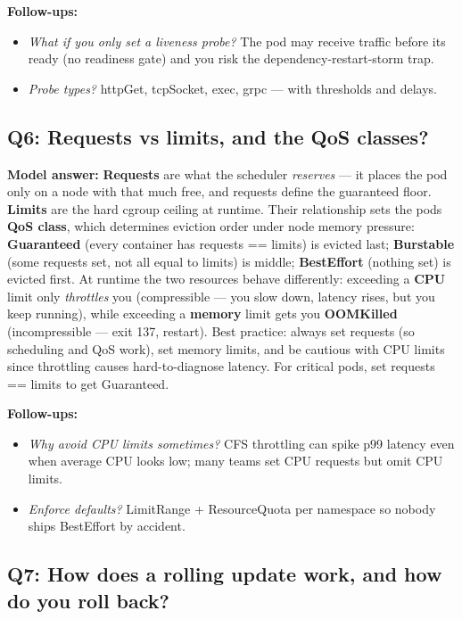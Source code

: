 \documentclass[11pt]{article}
\providecommand{\tightlist}{\setlength{\itemsep}{1pt}\setlength{\parskip}{0pt}}
\begin{document}
\textbf{Follow-ups:}

\begin{itemize}
\tightlist
\item
  \emph{What if you only set a liveness probe?} The pod may receive traffic before it\textquotesingle s ready (no readiness gate) and you risk the dependency-restart-storm trap.
\item
  \emph{Probe types?} httpGet, tcpSocket, exec, grpc --- with thresholds and delays.
\end{itemize}

\subsection{Q6: Requests vs limits, and the QoS classes?}\label{q6-requests-vs-limits-and-the-qos-classes}

\textbf{Model answer:}
\textbf{Requests} are what the scheduler \emph{reserves} --- it places the pod only on a node with that much free, and requests define the guaranteed floor. \textbf{Limits} are the hard cgroup ceiling at runtime. Their relationship sets the pod\textquotesingle s \textbf{QoS class}, which determines eviction order under node memory pressure: \textbf{Guaranteed} (every container has requests == limits) is evicted last; \textbf{Burstable} (some requests set, not all equal to limits) is middle; \textbf{BestEffort} (nothing set) is evicted first. At runtime the two resources behave differently: exceeding a \textbf{CPU} limit only \emph{throttles} you (compressible --- you slow down, latency rises, but you keep running), while exceeding a \textbf{memory} limit gets you \textbf{OOMKilled} (incompressible --- exit 137, restart). Best practice: always set requests (so scheduling and QoS work), set memory limits, and be cautious with CPU limits since throttling causes hard-to-diagnose latency. For critical pods, set requests == limits to get Guaranteed.

\textbf{Follow-ups:}

\begin{itemize}
\tightlist
\item
  \emph{Why avoid CPU limits sometimes?} CFS throttling can spike p99 latency even when average CPU looks low; many teams set CPU requests but omit CPU limits.
\item
  \emph{Enforce defaults?} LimitRange + ResourceQuota per namespace so nobody ships BestEffort by accident.
\end{itemize}

\subsection{Q7: How does a rolling update work, and how do you roll back?}\label{q7-how-does-a-rolling-update-work-and-how-do-you-roll-back}
\end{document}
